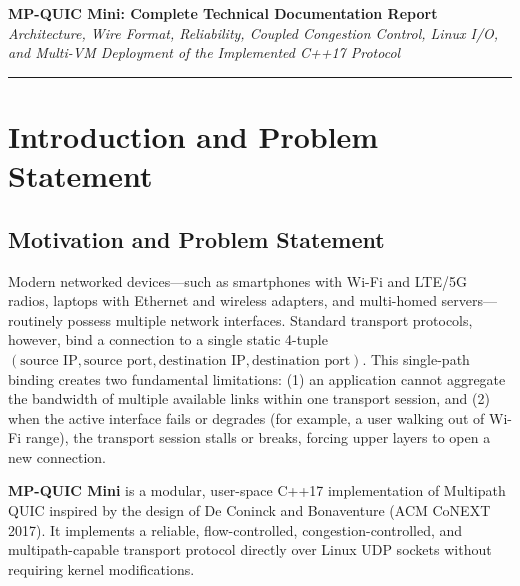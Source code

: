 \documentclass[10pt,a4paper]{article}
\begin{document}
\begin{center}
    {\Large\bfseries MP-QUIC Mini: Complete Technical Documentation Report}\\[0.25em]
    {\small\textit{Architecture, Wire Format, Reliability, Coupled Congestion Control, Linux I/O, and Multi-VM Deployment of the Implemented C++17 Protocol}}
\end{center}
\vspace{0.2em}
\hrule
\vspace{0.5em}

\section{Introduction and Problem Statement}

\subsection{Motivation and Problem Statement}
Modern networked devices—such as smartphones with Wi-Fi and LTE/5G radios, laptops with Ethernet and wireless adapters, and multi-homed servers—routinely possess multiple network interfaces. Standard transport protocols, however, bind a connection to a single static 4-tuple $(\text{source IP}, \text{source port}, \text{destination IP}, \text{destination port})$. This single-path binding creates two fundamental limitations: (1) an application cannot aggregate the bandwidth of multiple available links within one transport session, and (2) when the active interface fails or degrades (for example, a user walking out of Wi-Fi range), the transport session stalls or breaks, forcing upper layers to open a new connection.

\textbf{MP-QUIC Mini} is a modular, user-space C++17 implementation of Multipath QUIC inspired by the design of De Coninck and Bonaventure (ACM CoNEXT 2017). It implements a reliable, flow-controlled, congestion-controlled, and multipath-capable transport protocol directly over Linux UDP sockets without requiring kernel modifications.
\end{document}
